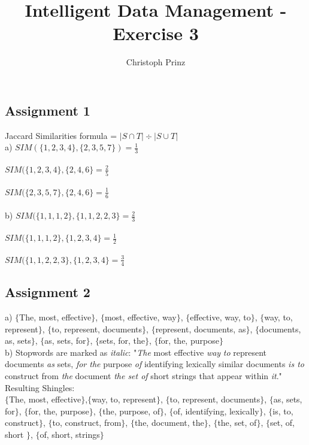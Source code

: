 \documentclass[]{scrartcl}
\title{Intelligent Data Management - Exercise 3}
\author{Christoph Prinz}
\begin{document}
\maketitle

\subsection*{Assignment 1}

Jaccard Similarities formula = $|S \cap T| \div |S \cup T|$ \\

a) $SIM(\{1, 2, 3, 4\}, \{2, 3, 5, 7\}) = \frac{1}{3}$\\\\
$SIM(\{1, 2, 3, 4\},\{2, 4, 6\} = \frac{2}{5}$\\\\
$SIM(\{2, 3, 5, 7\}, \{2, 4, 6\} = \frac{1}{6}$\\\\

b) $SIM(\{1, 1, 1, 2\}, \{1, 1, 2, 2, 3\} = \frac{2}{3}$\\\\
$SIM(\{1, 1, 1, 2\}, \{1, 2, 3, 4\} = \frac{1}{2}$\\\\
$SIM(\{1, 1, 2, 2, 3\}, \{1, 2, 3, 4\} = \frac{3}{4}$\\

\subsection*{Assignment 2}

a) $\{$The, most, effective$\}$, $\{$most, effective, way$\}$, $\{$effective, way, to$\}$, $\{$way, to, represent$\}$, $\{$to, represent, documents$\}$, $\{$represent, documents, as$\}$, $\{$documents, as, sets$\}$, $\{$as, sets, for$\}$, $\{$sets, for, the$\}$, $\{$for, the, purpose$\}$ \\


b) Stopwords are marked as \textit{italic}: "\textit{The} most effective \textit{way} \textit{to} represent documents \textit{as} sets,\textit{ for the} purpose \textit{of} identifying lexically similar documents \textit{is to} construct from \textit{the} document \textit{the set of} short strings that appear within \textit{it}."\\

Resulting Shingles:\\

$\{$The, most, effective$\}$,$\{$way, to, represent$\}$, $\{$to, represent, documents$\}$, $\{$as, sets, for$\}$, $\{$for, the, purpose$\}$, $\{$the, purpose, of$\}$, $\{$of, identifying, lexically$\}$, $\{$is, to, construct$\}$, $\{$to, construct, from$\}$, $\{$the, document, the$\}$, $\{$the, set, of$\}$, $\{$set, of, short $\}$, $\{$of, short, strings$\}$
\end{document}
